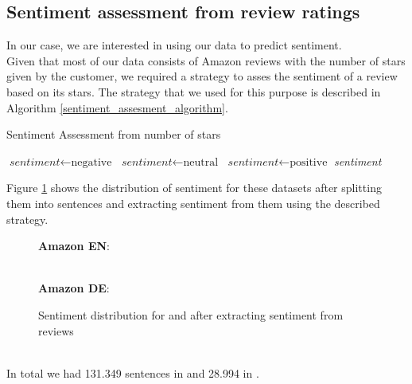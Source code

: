 \subsection{Sentiment assessment from review ratings}
In our case, we are interested in using our data to predict sentiment.\\
Given that most of our data consists of Amazon reviews with the number of stars given by the customer, we required a strategy to asses the sentiment of a review based on its stars. The strategy that we used for this purpose is described in Algorithm \ref{sentiment_assesment_algorithm}.\\
\begin{algorithm}[b]
\caption{Sentiment Assessment from number of stars}\label{euclid}
\label{sentiment_assesment_algorithm}
\begin{algorithmic}[1]
    \State $\textit{sentiment} \gets \text{negative}$
    \State $\textit{sentiment} \gets \text{neutral}$
\Else
    \State $\textit{sentiment} \gets \text{positive}$
\EndIf
\Return \textit{sentiment}
\EndProcedure
\end{algorithmic}
\end{algorithm}
Figure \ref{amazon_sentiment_pie_chart} shows the distribution of sentiment for these datasets after splitting them into sentences and extracting sentiment from them using the described strategy.\\
\begin{figure}[h]
{\bf Amazon EN}:\\
\\
{\bf Amazon DE}:\\
\caption{Sentiment distribution for \dataEN and \dataDE after extracting sentiment from reviews}
\label{amazon_sentiment_pie_chart}
\end{figure}\\
In total we had 131.349 sentences in {\dataEN} and 28.994 in {\dataDE}.\\
